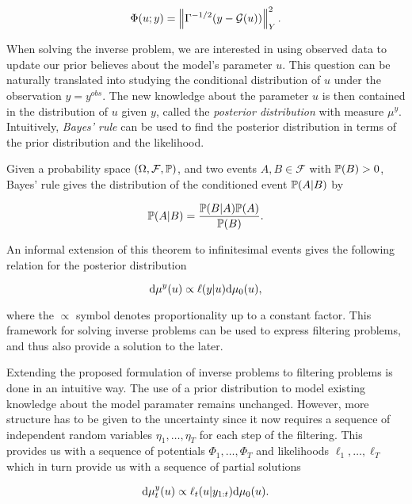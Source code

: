 \begin{equation} \label{gaussian-potential}
  \Phi(u; y) = \norm{\Gamma^{-1/2}(y - \G(u))}_Y^2.
\end{equation}

When solving the inverse problem, we are interested in using observed data to update our prior believes about the model's parameter $u$. This question can be naturally translated into studying the conditional distribution of $u$ under the observation $y = y^{obs}$. The new knowledge about the parameter $u$ is then contained in the distribution of $u$ given $y$, called the \textit{posterior distribution} with measure $\mu^y$. Intuitively, \textit{Bayes' rule} can be used to find the posterior distribution in terms of the prior distribution and the likelihood.

Given a probability space $(\Omega, \mathcal{F}, \P)$, and two events $A, B \in \mathcal{F}$ with $\P(B) > 0$, Bayes' rule gives the distribution of the conditioned event $\P(A|B)$ by

\begin{equation*}
  \P(A|B) = \frac{\P(B|A)\P(A)}{\P(B)}.
\end{equation*}

An informal extension of this theorem to infinitesimal events gives the following relation for the posterior distribution 

\begin{equation}\label{bayes-rule}
  \d\mu^y(u) \propto \ell(y|u)\d\mu_0(u),
\end{equation}

where the $\propto$ symbol denotes proportionality up to a constant factor. This framework for solving inverse problems can be used to express filtering problems, and thus also provide a solution to the later. 

Extending the proposed formulation of inverse problems to filtering problems is done in an intuitive way. The use of a prior distribution to model existing knowledge about the model paramater remains unchanged. However, more structure has to be given to the uncertainty since it now requires a sequence of independent random variables $\eta_1, \ldots, \eta_T$ for each step of the filtering. This provides us with a sequence of potentials $\Phi_1, \ldots, \Phi_T$ and likelihoods $\ell_1, \ldots, \ell_T$ which in turn provide us with a sequence of partial solutions

\begin{equation*}
  \d\mu_t^y(u) \propto \ell_t(u|y_{1:t})\d\mu_0(u).
\end{equation*}


